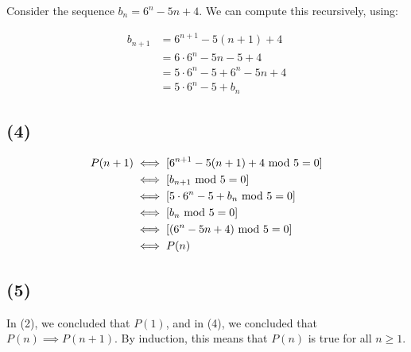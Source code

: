 \documentclass[a4paper]{article}
\begin{document}
Consider the sequence $b_n = 6^n - 5n + 4$. We can compute this recursively, using:

\[
\begin{aligned}
b_{n+1} &= 6^{n+1} - 5(n+1) + 4 \\
&= 6\cdot6^{n} - 5n - 5 + 4 \\
&= 5\cdot6^{n} - 5 + 6^{n} - 5n + 4 \\
&= 5\cdot6^{n} - 5 + b_n
\end{aligned}
\]

\subsection{(4)}

\[
\begin{aligned}
P(n+1) &\iff [6^{n+1} - 5(n+1) + 4 \text{ mod } 5 = 0] \\
&\iff [b_{n+1} \text{ mod } 5 = 0] \\
&\iff [5\cdot6^{n} - 5 +  b_n \text{ mod } 5 = 0] \\
&\iff [b_n \text{ mod } 5 = 0] \\
&\iff [(6^n - 5n + 4) \text{ mod } 5 = 0] \\
&\iff P(n)
\end{aligned}
\]

\subsection{(5)}

In (2), we concluded that $P(1)$, and in (4), we concluded that $P(n) \implies P(n+1)$. By induction, this means that $P(n)$ is true for all $n \ge 1$.
\end{document}
